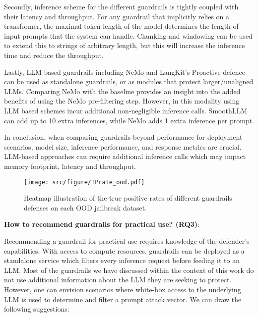 

Secondly, inference scheme for the different guardrails is tightly coupled with their latency and throughput.
For any guardrail that implicitly relies on a transformer, the maximal token length of the model determines the length of input prompts that the system can handle.
Chunking and windowing can be used to extend this to strings of arbitrary length, but this will increase the inference time and reduce the throughput.

Lastly, LLM-based guardrails including NeMo and LangKit's Proactive defence can be used as standalone guardrails, or as modules that protect larger/unaligned LLMs.
Comparing NeMo with the baseline provides an insight into the added benefits of using the NeMo pre-filtering step. 
However, in this modality using LLM based schemes incur additional non-negligible inference calls. SmoothLLM can add up to 10 extra inferences, while NeMo adds 1 extra inference per prompt.

In conclusion, when comparing guardrails beyond performance for deployment scenarios, model size, inference performance, and response metrics are crucial. LLM-based approaches can require additional inference calls which may impact memory footprint, latency and throughput.

\begin{figure}
    \centering
    \centerline{\texttt{[image: src/figure/TPrate\_ood.pdf]}}
    \caption{Heatmap illustration of the true positive rates of different guardrails defenses on each OOD jailbreak dataset.}
    \label{fig:TPrate_ood}
\end{figure}


\textbf{How to recommend guardrails for practical use? (RQ3)}:

Recommending a guardrail for practical use requires knowledge of the defender's capabilities.
With access to compute resources, guardrails can be deployed as a standalone service which filters every inference request before feeding it to an LLM.
Most of the guardrails we have discussed within the context of this work do not use additional information about the LLM they are seeking to protect.
However, one can envision scenarios where white-box access to the underlying LLM is used to determine and filter a prompt attack vector. We can draw the following suggestions:

